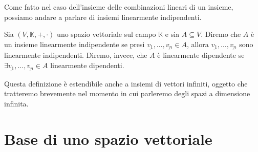 Come fatto nel caso dell'insieme delle combinazioni lineari di un insieme, possiamo andare a parlare di insiemi linearmente indipendenti.
\begin{definition}
    Sia $(V, \mathbb{K}, +, \cdot)$ uno spazio vettoriale sul campo $\mathbb{K}$ e sia $A \subseteq V$. Diremo che $A$ è un insieme linearmente indipendente se presi $\underline{v_1}, \ldots, \underline{v_n} \in A$, allora $\underline{v_1}, \ldots, \underline{v_n}$ sono linearmente indipendenti.
    Diremo, invece, che $A$ è linearmente dipendente se $\exists \underline{v_1}, \ldots, \underline{v_n} \in A$ linearmente dipendenti.
\end{definition}
\begin{remark}
    Questa definizione è estendibile anche a insiemi di vettori infiniti, oggetto che tratteremo brevemente nel momento in cui parleremo degli spazi a dimensione infinita.
\end{remark}
\section{Base di uno spazio vettoriale}

